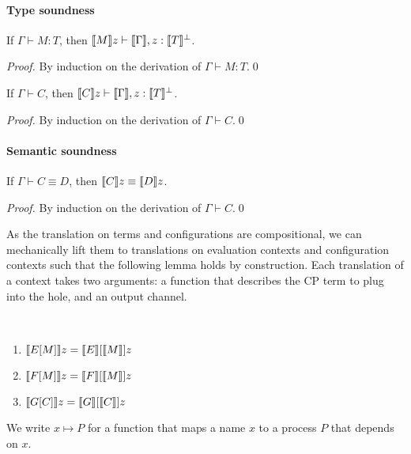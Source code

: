 \documentclass[orivec,envcountsame]{llncs}
\begin{document}
\paragraph{Type soundness}

\begin{theorem}
  If $\Gamma \vdash M : T$, then $\llbracket M \rrbracket z \vdash \llbracket \Gamma \rrbracket, z:\llbracket T \rrbracket^\perp$.
\end{theorem}
\begin{proof}
By induction on the derivation of $\Gamma \vdash M : T$.\qed
\end{proof}

\begin{theorem}
  If $\Gamma \vdash C$, then $\llbracket C \rrbracket z \vdash \llbracket \Gamma \rrbracket, z:\llbracket T \rrbracket^\perp$.
\end{theorem}
\begin{proof}
By induction on the derivation of $\Gamma \vdash C$.\qed
\end{proof}

\paragraph{Semantic soundness}

\begin{theorem}
If $\Gamma \vdash C \equiv D$, then $\llbracket C \rrbracket z \equiv \llbracket D \rrbracket z$.
\end{theorem}
%
\begin{proof}
By induction on the derivation of $\Gamma \vdash C$.\qed
\end{proof}

As the translation on terms and configurations are compositional, we can mechanically lift them to
translations on evaluation contexts and configuration contexts such that the following lemma holds
by construction.
%
Each translation of a context takes two arguments: a function that describes the CP term to plug
into the hole, and an output channel.
%
%
\begin{lemma}
~
\begin{enumerate}
\item $\llbracket E[M] \rrbracket z = \llbracket E \rrbracket[\llbracket M \rrbracket]z$
\item $\llbracket F[M] \rrbracket z = \llbracket F \rrbracket[\llbracket M \rrbracket]z$
\item $\llbracket G[C] \rrbracket z = \llbracket G \rrbracket[\llbracket C \rrbracket]z$
\end{enumerate}
\end{lemma}
%
We write $x \mapsto P$ for a function that maps a name $x$ to a process $P$ that depends on $x$.
\end{document}
